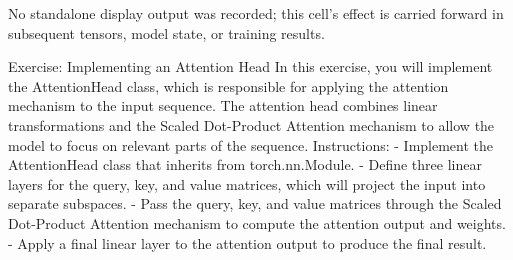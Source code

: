 \documentclass[../labs.tex]{subfiles}
\begin{document}
\hypertarget{res:lab02-text-02-attention-ipynb-14-b7a7f8b843db}{}\noindent No standalone display output was recorded; this cell’s effect is carried forward in subsequent tensors, model state, or training results.



\noindent Exercise: Implementing an Attention Head In this exercise, you will implement the AttentionHead class, which is responsible for applying the attention mechanism to the input sequence. The attention head combines linear transformations and the Scaled Dot-Product Attention mechanism to allow the model to focus on relevant parts of the sequence. Instructions: - Implement the AttentionHead class that inherits from torch.nn.Module. - Define three linear layers for the query, key, and value matrices, which will project the input into separate subspaces. - Pass the query, key, and value matrices through the Scaled Dot-Product Attention mechanism to compute the attention output and weights. - Apply a final linear layer to the attention output to produce the final result.
\end{document}

